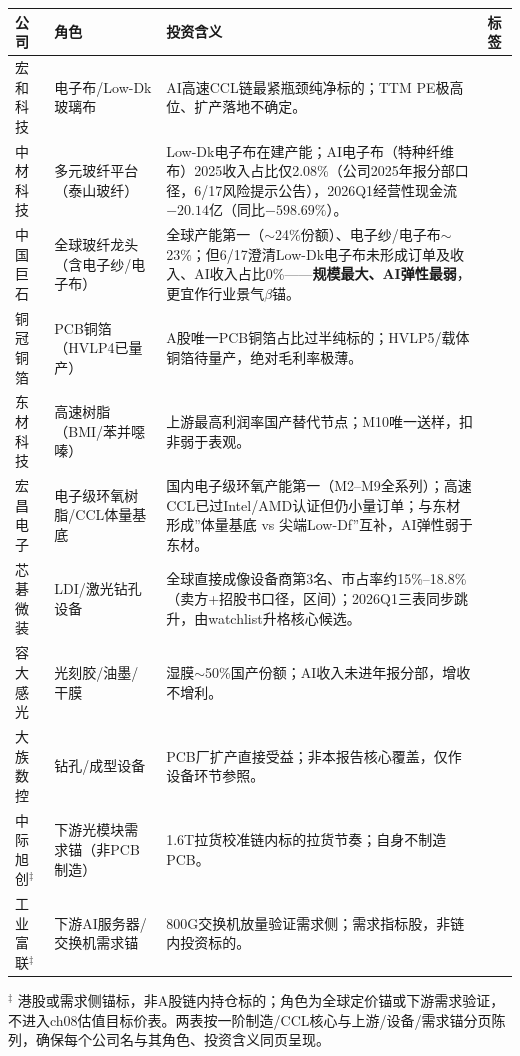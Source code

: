 \begin{exhibitbox}
\small
\begin{tabularx}{\textwidth}{L{2.3cm}L{3.0cm}X L{2.5cm}}
\toprule
\textbf{公司} & \textbf{角色} & \textbf{投资含义} & \textbf{标签} \\
\midrule
宏和科技 & 电子布/Low-Dk玻璃布 & AI高速CCL链最紧瓶颈纯净标的；TTM PE极高位、扩产落地不确定。 &  \\
中材科技 & 多元玻纤平台（泰山玻纤） & Low-Dk电子布在建产能；AI电子布（特种纤维布）2025收入占比仅2.08\%（公司2025年报分部口径，6/17风险提示公告），2026Q1经营性现金流$-20.14$亿（同比$-598.69\%$）。 &  \\
中国巨石 & 全球玻纤龙头（含电子纱/电子布） & 全球产能第一（$\sim$24\%份额）、电子纱/电子布$\sim$23\%；但6/17澄清Low-Dk电子布未形成订单及收入、AI收入占比0\%——\textbf{规模最大、AI弹性最弱}，更宜作行业景气$\beta$锚。 &  \\
铜冠铜箔 & PCB铜箔（HVLP4已量产） & A股唯一PCB铜箔占比过半纯标的；HVLP5/载体铜箔待量产，绝对毛利率极薄。 &  \\
东材科技 & 高速树脂（BMI/苯并噁嗪） & 上游最高利润率国产替代节点；M10唯一送样，扣非弱于表观。 &  \\
宏昌电子 & 电子级环氧树脂/CCL体量基底 & 国内电子级环氧产能第一（M2--M9全系列）；高速CCL已过Intel/AMD认证但仍小量订单；与东材形成”体量基底 vs 尖端Low-Df”互补，AI弹性弱于东材。 &  \\
芯碁微装 & LDI/激光钻孔设备 & 全球直接成像设备商第3名、市占率约15\%--18.8\%（卖方+招股书口径，区间）；2026Q1三表同步跳升，由watchlist升格核心候选。 &  \\
容大感光 & 光刻胶/油墨/干膜 & 湿膜$\sim$50\%国产份额；AI收入未进年报分部，增收不增利。 &  \\
大族数控 & 钻孔/成型设备 & PCB厂扩产直接受益；非本报告核心覆盖，仅作设备环节参照。 &  \\
中际旭创$^\ddagger$ & 下游光模块需求锚（非PCB制造） & 1.6T拉货校准链内标的拉货节奏；自身不制造PCB。 &  \\
工业富联$^\ddagger$ & 下游AI服务器/交换机需求锚 & 800G交换机放量验证需求侧；需求指标股，非链内投资标的。 &  \\
\bottomrule
\end{tabularx}
\smallskip\par{\footnotesize $^\ddagger$ 港股或需求侧锚标，非A股链内持仓标的；角色为全球定价锚或下游需求验证，不进入ch08估值目标价表。两表按一阶制造/CCL核心与上游/设备/需求锚分页陈列，确保每个公司名与其角色、投资含义同页呈现。}
\end{exhibitbox}

